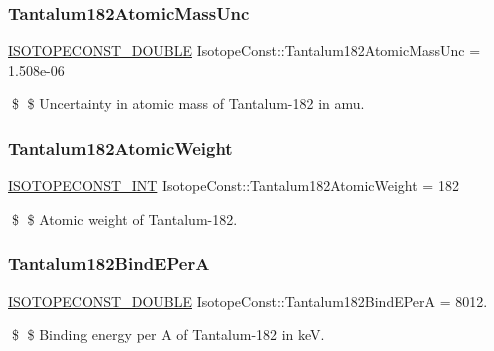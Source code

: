 \subsubsection{\texorpdfstring{Tantalum182\+Atomic\+Mass\+Unc}{Tantalum182AtomicMassUnc}}
{\footnotesize\ttfamily \mbox{\hyperlink{group___isotope_const-_macros_ga8f45a7272ce02c0b4c65c44636ed719a}{I\+S\+O\+T\+O\+P\+E\+C\+O\+N\+S\+T\+\_\+\+D\+O\+U\+B\+LE}} Isotope\+Const\+::\+Tantalum182\+Atomic\+Mass\+Unc = 1.\+508e-\/06}

\$ \$ Uncertainty in atomic mass of Tantalum-\/182 in amu. \mbox{\label{group___isotope_const-_tantalum-_ta182_gaecd1a50d069e3eac6b423c4d61d76475}} 
\subsubsection{\texorpdfstring{Tantalum182\+Atomic\+Weight}{Tantalum182AtomicWeight}}
{\footnotesize\ttfamily \mbox{\hyperlink{group___isotope_const-_macros_ga5f18360b3e99483a35c32d789e62621c}{I\+S\+O\+T\+O\+P\+E\+C\+O\+N\+S\+T\+\_\+\+I\+NT}} Isotope\+Const\+::\+Tantalum182\+Atomic\+Weight = 182}

\$ \$ Atomic weight of Tantalum-\/182. \mbox{\label{group___isotope_const-_tantalum-_ta182_ga170d22935b9a9edcb1a74b7ce862cf29}} 
\subsubsection{\texorpdfstring{Tantalum182\+Bind\+E\+PerA}{Tantalum182BindEPerA}}
{\footnotesize\ttfamily \mbox{\hyperlink{group___isotope_const-_macros_ga8f45a7272ce02c0b4c65c44636ed719a}{I\+S\+O\+T\+O\+P\+E\+C\+O\+N\+S\+T\+\_\+\+D\+O\+U\+B\+LE}} Isotope\+Const\+::\+Tantalum182\+Bind\+E\+PerA = 8012.}

\$ \$ Binding energy per A of Tantalum-\/182 in keV. \mbox{\label{group___isotope_const-_tantalum-_ta182_gac6af31f91bc873974602e7710b2c0096}} 
